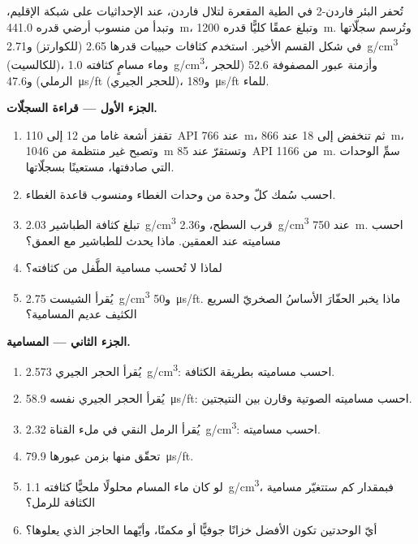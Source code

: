 \begin{problem}
\label{pb:b3:facies-models:1}
تُحفر البئر فاردن-2 في الطية المقعرة لتلال فاردن، عند الإحداثيات  على
شبكة الإقليم، وتبدأ من منسوب أرضي قدره \qty{441.0}{m}،
وتبلغ عمقًا كليًّا قدره \qty{1200}{m}. وتُرسم سجلّاتها في شكل القسم الأخير.
استخدم كثافات حبيبات قدرها 2.65 (للكوارتز)
و\qty{2.71}{g/cm^3} (للكالسيت)، وماء مسامٍ كثافته \qty{1.0}{g/cm^3}، وأزمنة عبور المصفوفة
52.6 (للحجر الرملي) و\qty{47.6}{\micro\second/ft}
(للحجر الجيري)، و\qty{189}{\micro\second/ft} للماء.

\medskip\noindent\textbf{الجزء الأول --- قراءة السجلّات.}
\begin{enumerate}
\item تقفز أشعة غاما من 12 إلى \qty{110}{API} عند \qty{766}{m}، ثم تنخفض
  إلى 18 عند \qty{866}{m}، وتصبح غير منتظمة من \qty{1046}{m} وتستقرّ عند
  \qty{85}{API} من \qty{1166}{m}. سمِّ الوحدات التي صادفتها، مستعينًا بسجلّاتها.
\item احسب سُمك كلّ وحدة من وحدات الغطاء ومنسوب
  قاعدة الغطاء.
\item تبلغ كثافة الطباشير \qty{2.03}{g/cm^3} قرب السطح،
  و\qty{2.36}{g/cm^3} عند \qty{750}{m}. احسب مساميته عند العمقين.
  ماذا يحدث للطباشير مع العمق؟
\item لماذا لا تُحسب مسامية الطَّفل من كثافته؟
\item يُقرأ الشيست \qty{2.75}{g/cm^3} و\qty{50}{\micro\second/ft}.
  ماذا يخبر الحفّارَ الأساسُ الصخريّ السريع الكثيف عديم المسامية؟
\end{enumerate}

\medskip\noindent\textbf{الجزء الثاني --- المسامية.}
\begin{enumerate}[resume]
\item يُقرأ الحجر الجيري \qty{2.573}{g/cm^3}: احسب مساميته بطريقة الكثافة.
\item يُقرأ الحجر الجيري نفسه \qty{58.9}{\micro\second/ft}: احسب مساميته الصوتية
  وقارن بين النتيجتين.
\item يُقرأ الرمل النقي في ملء القناة \qty{2.32}{g/cm^3}: احسب
  مساميته.
\item تحقّق منها بزمن عبورها \qty{79.9}{\micro\second/ft}.
\item لو كان ماء المسام محلولًا ملحيًّا كثافته \qty{1.1}{g/cm^3}، فبمقدار كم
  ستتغيّر مسامية الكثافة للرمل؟
\item أيّ الوحدتين تكون الأفضل خزانًا جوفيًّا أو مكمنًا، وأيّهما
  الحاجز الذي يعلوها؟
\end{enumerate}


\end{problem}
